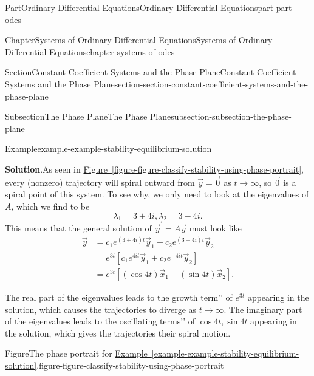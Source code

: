 \documentclass[twoside,10pt,]{book}
\newcommand{\blocktitlefont}{\relax}
\newcommand{\xreffont}{\relax}
\numberwithin{equation}{part}
\newcommand{\brackets}[1]{\left[ #1 \right]}
\begin{document}
\begin{partptx}{Part}{Ordinary Differential Equations}{}{Ordinary Differential Equations}{}{}{part-part-odes}
\begin{chapterptx}{Chapter}{Systems of Ordinary Differential Equations}{}{Systems of Ordinary Differential Equations}{}{}{chapter-systems-of-odes}
\begin{sectionptx}{Section}{Constant Coefficient Systems and the Phase Plane}{}{Constant Coefficient Systems and the Phase Plane}{}{}{section-section-constant-coefficient-systems-and-the-phase-plane}
\begin{subsectionptx}{Subsection}{The Phase Plane}{}{The Phase Plane}{}{}{subsection-subsection-the-phase-plane}
\begin{example}{Example}{}{example-example-stability-equilibrium-solution}
\begin{equation*}
\end{equation*}
%
\par\smallskip%
\noindent\textbf{\blocktitlefont Solution}.\hypertarget{solution-example-stability-equilibrium-solution-b}{}\quad{}As seen in \hyperref[figure-figure-classify-stability-using-phase-portrait]{Figure~{\xreffont\ref{figure-figure-classify-stability-using-phase-portrait}}}, every (nonzero) trajectory will spiral outward from \(\vec{y} = \vec{0}\) as \(t\to\infty\), so \(\vec{0}\) is a spiral point of this system. To see why, we only need to look at the eigenvalues of \(A\), which we find to be%
\begin{equation*}
\lambda_{1} = 3+4i,\lambda_{2} = 3-4i.
\end{equation*}
This means that the general solution of \(\vec{y}^\prime = A\vec{y}\) must look like%
\begin{align*}
\vec{y} & = c_{1}e^{(3+4i)t}\vec{y}_{1} + c_{2}e^{(3-4i)t}\vec{y}_{2}\\
& = e^{3t}\brackets{c_{1}e^{4it}\vec{y}_{1}+c_{2}e^{-4it}\vec{y}_{2}}\\
& = e^{3t}\brackets{(\cos4t)\vec{x}_{1}+(\sin4t)\vec{x}_{2}}\text{.}
\end{align*}
%
\par
The real part of the eigenvalues leads to the \textasciigrave{}\textasciigrave{}growth term'{}'{} of \(e^{3t}\) appearing in the solution, which causes the trajectories to diverge as \(t\to\infty\). The imaginary part of the eigenvalues leads to the \textasciigrave{}\textasciigrave{}oscillating terms'{}'{} of \(\cos4t,\sin4t\) appearing in the solution, which gives the trajectories their spiral motion.%
\end{example}
\begin{figureptx}{Figure}{The phase portrait for \hyperref[example-example-stability-equilibrium-solution]{Example~{\xreffont\ref{example-example-stability-equilibrium-solution}}}.}{figure-figure-classify-stability-using-phase-portrait}{}%
\begin{image}{0.25}{0.5}{0.25}{}%

\end{image}
\end{figureptx}
\end{subsectionptx}
\end{sectionptx}
\end{chapterptx}
\end{partptx}
\end{document}
